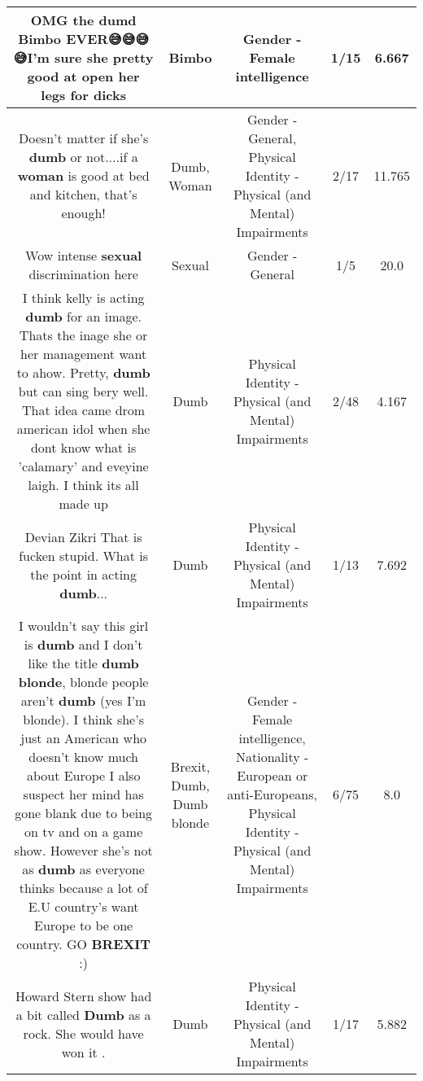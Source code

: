 \documentclass[11pt]{article}
\newlength\mylength
\begin{document}
\begin{center}
\begin{longtable}{|C{.65\mylength}|C{.30\mylength}|C{.12\mylength}|C{.12\mylength}|C{.12\mylength}|}
  \small OMG the dumd \textbf{Bimbo} EVER😅😅😅😅I'm sure she pretty good at open her legs for dicks\normalsize   & Bimbo & Gender - Female intelligence & 1/15 & 6.667 \\  \hline
  \small Doesn't matter if she's \textbf{dumb} or not....if a \textbf{woman} is good at bed and kitchen, that's enough!\normalsize   & Dumb, Woman & Gender - General, Physical Identity - Physical (and Mental) Impairments & 2/17 & 11.765 \\  \hline
  \small Wow intense \textbf{sexual} discrimination here\normalsize   & Sexual & Gender - General & 1/5 & 20.0 \\  \hline
  \small I think kelly is acting \textbf{dumb} for an image. Thats the inage she or her management want to ahow. Pretty, \textbf{dumb} but can sing bery well. That idea came drom american idol when she dont know what is 'calamary' and eveyine laigh. I think its all made up\normalsize   & Dumb & Physical Identity - Physical (and Mental) Impairments & 2/48 & 4.167 \\  \hline
  \small Devian Zikri That is fucken stupid. What is the point in acting \textbf{dumb}...\normalsize   & Dumb & Physical Identity - Physical (and Mental) Impairments & 1/13 & 7.692 \\  \hline
  \small I wouldn't say this girl is \textbf{dumb} and I don't like the title \textbf{d\textbf{umb} blonde}, blonde people aren't \textbf{dumb} (yes I'm blonde). I think she's just an American who doesn't know much about Europe I also suspect her mind has gone blank due to being on tv and on a game show. However she's not as \textbf{dumb} as everyone thinks because a lot of E.U country's want Europe to be one country. GO \textbf{BREXIT} :)\normalsize   & Brexit, Dumb, Dumb blonde & Gender - Female intelligence, Nationality - European or anti-Europeans, Physical Identity - Physical (and Mental) Impairments & 6/75 & 8.0 \\  \hline
  \small Howard Stern show had a bit called \textbf{Dumb} as a rock. She would have won it .\normalsize   & Dumb & Physical Identity - Physical (and Mental) Impairments & 1/17 & 5.882 \\  \hline

\end{longtable}
\end{center}
\end{document}
